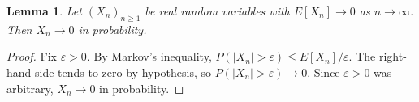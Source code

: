 \documentclass{article}
\newtheorem{lemma}{Lemma}
\begin{document}
\begin{lemma}\label{lem:signed-markov}
Let $(X_n)_{n \ge 1}$ be real random variables with $E[X_n] \to 0$ as
$n \to \infty$. Then $X_n \to 0$ in probability.
\end{lemma}

\begin{proof}
Fix $\varepsilon > 0$.
By Markov's inequality, $P(|X_n| > \varepsilon) \le E[X_n] / \varepsilon$.
The right-hand side tends to zero by hypothesis, so
$P(|X_n| > \varepsilon) \to 0$.
Since $\varepsilon > 0$ was arbitrary, $X_n \to 0$ in probability.
\end{proof}
\end{document}
